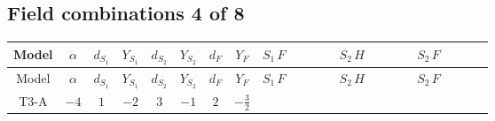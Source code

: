 \documentclass[8pt]{article}
\begin{document}
\begin{landscape}
\subsection*{Field combinations 4 of 8}
\begin{longtable}{@{}cccccccc >{\raggedright\arraybackslash}p{0.21\linewidth} >{\raggedright\arraybackslash}p{0.21\linewidth} >{\raggedright\arraybackslash}p{0.21\linewidth}@{}}
\toprule
Model & $\alpha$ & $d_{S_1}$ & $Y_{S_1}$ & $d_{S_2}$ & $Y_{S_2}$ & $d_F$ & $Y_F$ & $S_1\,F$ & $S_2\,H$ & $S_2\,F$ \\
\midrule
\endfirsthead
\toprule
Model & $\alpha$ & $d_{S_1}$ & $Y_{S_1}$ & $d_{S_2}$ & $Y_{S_2}$ & $d_F$ & $Y_F$ & $S_1\,F$ & $S_2\,H$ & $S_2\,F$ \\
\midrule
\endhead
T3-A & $-4$ & $1$ & $-2$ & $3$ & $-1$ & $2$ & $-\frac{3}{2}$ & \scriptsize\adjustbox{max width=\linewidth}{$\begin{gathered} -2 \hbar  \log \left(\frac{\bar{\mu}^{2}}{M_F^2}\right) \overline{y_{1,i_1,r_1}} \overline{y_{1,i_2,r_2}} S_1^2 y_{1,i_1,r_2} y_{1,i_2,r_1} \left(S_1{}^{\dagger }\right){}^2 \\ +2 C_{S_1^\dagger S_1} \hbar  \log \left(\frac{\bar{\mu}^{2}}{M_F^2}\right) \overline{y_{1,i_1,r_1}} S_1 y_{1,i_1,r_1} S_1{}^{\dagger } \\ -2 \hbar  \log \left(\frac{\bar{\mu}^{2}}{M_F^2}\right) \overline{y_{1,i_1,r_1}} S_1^2 y_{1,i_1,r_1} \left(S_1{}^{\dagger }\right){}^2 \lambda_{S_1}^{(1)}^{(1)}\end{gathered}$} & \scriptsize\adjustbox{max width=\linewidth}{$\begin{gathered} -\frac{2 \hbar  \overline{y_{2,i_1,r_1}} \overline{Y_{e,i_2,i_3}} H_{a_1} S_{2,j_1} y_{2,i_2,r_1} Y_{e,i_1,i_3} H_{a_1}{}^{\dagger } S_{2,j_1}{}^{\dagger }}{\sqrt{3} \epsilon } \\ -\frac{2 \hbar  \overline{y_{2,i_1,r_1}} \overline{Y_{e,i_2,i_3}} H_{a_1} S_{2,j_1} y_{2,i_2,r_1} Y_{e,i_1,i_3} H_{a_1}{}^{\dagger } S_{2,j_1}{}^{\dagger }}{\sqrt{3}} \\ -\frac{2 i \sqrt{\frac{2}{3}} \hbar  \overline{y_{2,i_1,r_1}} \overline{Y_{e,i_2,i_3}} H_{a_2} S_{2,j_2} y_{2,i_2,r_1} Y_{e,i_1,i_3} H_{a_1}{}^{\dagger } S_{2,j_1}{}^{\dagger } \mathcal{I}_{H2,a_1,a_2,j_1,j_2}{}^1}{\epsilon }\end{gathered}$} & \scriptsize\adjustbox{max width=\linewidth}{$\begin{gathered} +\frac{2}{3} \hbar  \log \left(\frac{\bar{\mu}^{2}}{M_F^2}\right) \overline{y_{2,i_1,r_1}} \overline{y_{2,i_2,r_2}} S_{2,j_2}^2 y_{2,i_1,r_2} y_{2,i_2,r_1} \left(S_{2,j_1}{}^{\dagger }\right){}^2 \\ +\frac{2 C_{S_2^\dagger S_2} \hbar  \log \left(\frac{\bar{\mu}^{2}}{M_F^2}\right) \overline{y_{2,i_1,r_1}} S_{2,j_1} y_{2,i_1,r_1} S_{2,j_1}{}^{\dagger }}{\sqrt{3}} \\ -\frac{4}{3} \hbar  \log \left(\frac{\bar{\mu}^{2}}{M_F^2}\right) \overline{y_{2,i_1,r_1}} \overline{y_{2,i_2,r_2}} S_{2,j_1} S_{2,j_2} y_{2,i_1,r_2} y_{2,i_2,r_1} S_{2,j_1}{}^{\dagger } S_{2,j_2}{}^{\dagger }\end{gathered}$} \\

\end{longtable}
\end{landscape}
\end{document}
